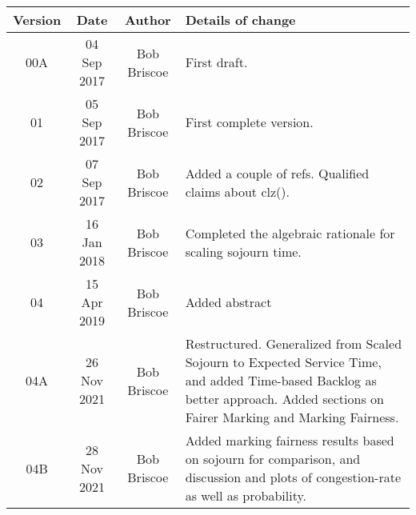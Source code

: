 \documentclass[a4paper,twoside,twocolumn]{article}
\newcommand*{\metaversion}{04B}
\newcommand*{\metadate}{28 Nov 2021}
\begin{document}
\begin{tabular}{|c|c|c|p{3.5in}|}
 \hline
Version &Date &Author &Details of change \\
 \hline\hline
00A     & 04 Sep 2017	&Bob Briscoe &First draft.\\\hline%
01      & 05 Sep 2017	&Bob Briscoe &First complete version.\\\hline%
02      & 07 Sep 2017	&Bob Briscoe &Added a couple of refs. Qualified claims about clz().\\\hline%
03      & 16 Jan 2018	&Bob Briscoe &Completed the algebraic rationale for scaling sojourn time.\\\hline%
04		& 15 Apr 2019	&Bob Briscoe &Added abstract\\\hline%
04A		& 26 Nov 2021	&Bob Briscoe &Restructured. Generalized from Scaled Sojourn to Expected Service Time, and added Time-based Backlog as better approach. Added sections on Fairer Marking and Marking Fairness.\\\hline%
\metaversion &\metadate&Bob Briscoe &Added marking fairness results based on sojourn for comparison, and discussion and plots of congestion-rate as well as probability.\\\hline%
\hline%
\end{tabular}
\end{document}
